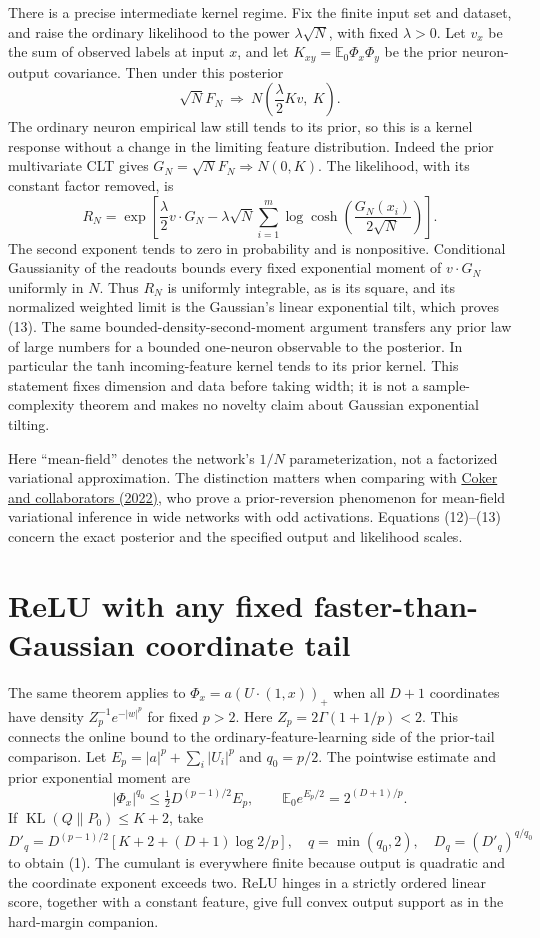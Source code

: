 \documentclass[11pt]{article}
\newcommand{\KL}{\operatorname{KL}}
\newcommand{\E}{\mathbb E}
\begin{document}
There is a precise intermediate kernel regime. Fix the finite input set
and dataset, and raise the ordinary likelihood to the power
$\lambda\sqrt N$, with fixed $\lambda>0$. Let $v_x$ be the sum of
observed labels at input $x$, and let
$K_{xy}=\E_0\Phi_x\Phi_y$ be the prior neuron-output covariance.
Then under this posterior
\[
 \sqrt N F_N\ \Longrightarrow\
       N\left(\frac\lambda2Kv,\ K\right).                 \tag{13}
\]
The ordinary neuron empirical law still tends to its prior, so this is
a kernel response without a change in the limiting feature distribution.
Indeed the prior multivariate CLT gives $G_N=\sqrt N F_N\Rightarrow
N(0,K)$. The likelihood, with its constant factor removed, is
\[
 R_N=\exp\left[\frac\lambda2v\cdot G_N
     -\lambda\sqrt N\sum_{i=1}^m
                  \log\cosh\left(\frac{G_N(x_i)}{2\sqrt N}\right)
       \right].
\]
The second exponent tends to zero in probability and is nonpositive.
Conditional Gaussianity of the readouts bounds every fixed exponential
moment of $v\cdot G_N$ uniformly in $N$. Thus $R_N$ is uniformly
integrable, as is its square, and its normalized weighted limit is the
Gaussian's linear exponential tilt, which proves (13). The same
bounded-density-second-moment argument transfers any prior law of large
numbers for a bounded one-neuron observable to the posterior. In
particular the tanh incoming-feature kernel tends to its prior kernel.
This statement fixes dimension and data before taking width; it is not
a sample-complexity theorem and makes no novelty claim about Gaussian
exponential tilting.

Here ``mean-field'' denotes the network's $1/N$ parameterization, not
a factorized variational approximation. The distinction matters when
comparing with \href{https://proceedings.mlr.press/v151/coker22a.html}
{Coker and collaborators (2022)}, who prove a prior-reversion phenomenon
for mean-field variational inference in wide networks with odd
activations. Equations (12)--(13) concern the exact posterior and the
specified output and likelihood scales.

\section{ReLU with any fixed faster-than-Gaussian coordinate tail}
The same theorem applies to $\Phi_x=a(U\cdot(1,x))_+$ when all
$D+1$ coordinates have density $Z_p^{-1}e^{-|w|^p}$ for fixed $p>2$.
Here $Z_p=2\Gamma(1+1/p)<2$. This connects the online bound to the
ordinary-feature-learning side of the prior-tail comparison.
Let $E_p=|a|^p+\sum_i|U_i|^p$ and $q_0=p/2$.
The pointwise estimate and prior exponential moment are
\[
 |\Phi_x|^{q_0}\le\tfrac12D^{(p-1)/2}E_p,
       \qquad \E_0e^{E_p/2}=2^{(D+1)/p}.
\]
If $\KL(Q\|P_0)\le K+2$, take
\[
 D'_q=D^{(p-1)/2}[K+2+(D+1)\log2/p],\quad
 q=\min(q_0,2),\quad D_q=(D'_q)^{q/q_0}
\]
to obtain (1). The cumulant is everywhere finite because output is
quadratic and the coordinate exponent exceeds two. ReLU hinges in a
strictly ordered linear score, together with a constant feature, give
full convex output support as in the hard-margin companion.
\end{document}
